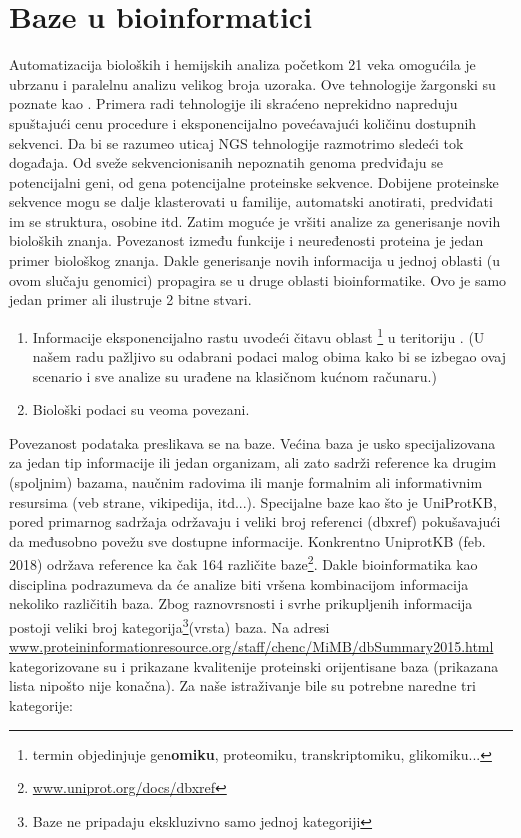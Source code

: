 \chapter{Baze u bioinformatici} %

\label{Baze} %


Automatizacija bioloških i hemijskih analiza početkom 21 veka omogućila je
ubrzanu i paralelnu analizu velikog broja uzoraka. Ove tehnologije žargonski su
poznate kao  . Primera radi tehnologije 
 ili skraćeno  neprekidno napreduju
spuštajući cenu procedure i eksponencijalno povećavajući količinu dostupnih
sekvenci. Da bi se razumeo uticaj NGS tehnologije razmotrimo sledeći tok
događaja.  Od sveže sekvencionisanih nepoznatih genoma predviđaju se
potencijalni geni, od gena potencijalne proteinske sekvence.  Dobijene
proteinske sekvence mogu se dalje klasterovati u familije, automatski
anotirati, predviđati im se struktura, osobine itd.  Zatim moguće je vršiti
analize za generisanje novih bioloških znanja. Povezanost između funkcije i
neuređenosti proteina je jedan primer biološkog znanja. Dakle generisanje novih
informacija u jednoj oblasti (u ovom slučaju genomici) propagira se u druge
oblasti bioinformatike. Ovo je samo jedan primer ali ilustruje 2 bitne stvari.
\begin{enumerate}
  \item Informacije eksponencijalno rastu uvodeći čitavu oblast
    \footnote{termin objedinjuje gen\textbf{omiku}, proteomiku,
    transkriptomiku, glikomiku...}   u teritoriju \parencite{Chen2017}. (U našem radu pažljivo su odabrani podaci malog
  obima kako bi se izbegao ovaj scenario i sve analize su urađene na klasičnom
  kućnom računaru.)
  \item Biološki podaci su veoma povezani.
\end{enumerate}

Povezanost podataka preslikava se na baze. Većina baza je usko specijalizovana
za jedan tip informacije ili jedan organizam, ali zato sadrži reference ka
drugim (spoljnim) bazama, naučnim radovima ili  manje formalnim ali
informativnim resursima (veb strane, vikipedija, itd...). Specijalne baze kao
što je UniProtKB, pored primarnog sadržaja održavaju i veliki broj referenci
(dbxref) pokušavajući da međusobno povežu sve dostupne informacije. Konkrentno
UniprotKB (feb. 2018) održava reference ka čak 164 različite
baze\footnote{\url{www.uniprot.org/docs/dbxref}}.  Dakle bioinformatika kao
disciplina podrazumeva da će analize biti vršena kombinacijom informacija
nekoliko različitih baza.  Zbog raznovrsnosti i svrhe prikupljenih informacija
postoji veliki broj kategorija\footnote{Baze ne pripadaju ekskluzivno samo
jednoj kategoriji}(vrsta) baza.  Na adresi
\url{www.proteininformationresource.org/staff/chenc/MiMB/dbSummary2015.html}
kategorizovane su i prikazane kvalitenije proteinski orijentisane baza
(prikazana lista nipošto nije konačna)\parencite{Chen2017}. Za naše
istraživanje bile su potrebne naredne tri kategorije:

